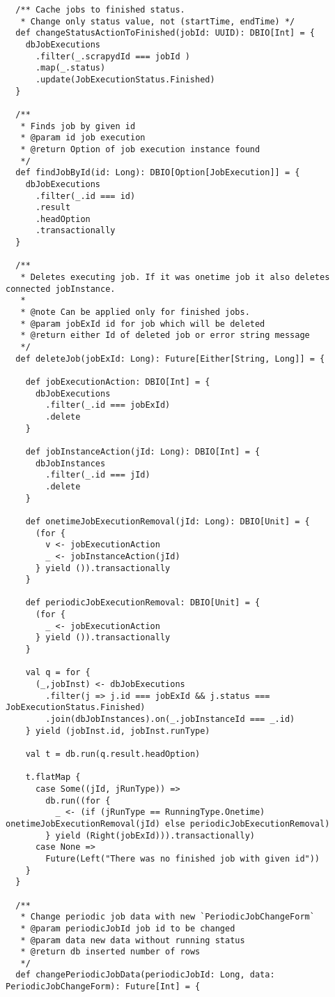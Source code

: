 \begin{lstlisting}
  /** Cache jobs to finished status.
   * Change only status value, not (startTime, endTime) */
  def changeStatusActionToFinished(jobId: UUID): DBIO[Int] = {
    dbJobExecutions
      .filter(_.scrapydId === jobId )
      .map(_.status)
      .update(JobExecutionStatus.Finished)
  }

  /**
   * Finds job by given id
   * @param id job execution
   * @return Option of job execution instance found
   */
  def findJobById(id: Long): DBIO[Option[JobExecution]] = {
    dbJobExecutions
      .filter(_.id === id)
      .result
      .headOption
      .transactionally
  }

  /**
   * Deletes executing job. If it was onetime job it also deletes connected jobInstance.
   *
   * @note Can be applied only for finished jobs.
   * @param jobExId id for job which will be deleted
   * @return either Id of deleted job or error string message
   */
  def deleteJob(jobExId: Long): Future[Either[String, Long]] = {

    def jobExecutionAction: DBIO[Int] = {
      dbJobExecutions
        .filter(_.id === jobExId)
        .delete
    }

    def jobInstanceAction(jId: Long): DBIO[Int] = {
      dbJobInstances
        .filter(_.id === jId)
        .delete
    }

    def onetimeJobExecutionRemoval(jId: Long): DBIO[Unit] = {
      (for {
        v <- jobExecutionAction
        _ <- jobInstanceAction(jId)
      } yield ()).transactionally
    }

    def periodicJobExecutionRemoval: DBIO[Unit] = {
      (for {
        _ <- jobExecutionAction
      } yield ()).transactionally
    }

    val q = for {
      (_,jobInst) <- dbJobExecutions
        .filter(j => j.id === jobExId && j.status === JobExecutionStatus.Finished)
        .join(dbJobInstances).on(_.jobInstanceId === _.id)
    } yield (jobInst.id, jobInst.runType)

    val t = db.run(q.result.headOption)

    t.flatMap {
      case Some((jId, jRunType)) =>
        db.run((for {
          _ <- (if (jRunType == RunningType.Onetime) onetimeJobExecutionRemoval(jId) else periodicJobExecutionRemoval)
        } yield (Right(jobExId))).transactionally)
      case None =>
        Future(Left("There was no finished job with given id"))
    }
  }

  /**
   * Change periodic job data with new `PeriodicJobChangeForm`
   * @param periodicJobId job id to be changed
   * @param data new data without running status
   * @return db inserted number of rows
   */
  def changePeriodicJobData(periodicJobId: Long, data: PeriodicJobChangeForm): Future[Int] = {


\end{lstlisting}
